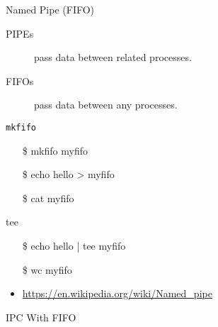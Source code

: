 \begin{frame}{Named Pipe (FIFO)}
  \begin{description}
  \item[PIPEs] pass data between related processes.
  \item[FIFOs] pass data between any processes.
  \end{description}
  \begin{block}{\texttt{mkfifo}}
    \begin{center}
      \begin{minipage}{.45\linewidth}\ttfamily
        \begin{itemize}
        \item[\$] mkfifo myfifo
        \item[\$] echo hello > myfifo
        \item[\$] cat myfifo
        \end{itemize}
      \end{minipage}\quad
      \begin{minipage}{.5\linewidth}
      \end{minipage}
    \end{center}
  \end{block}
  \ttfamily
  \begin{block}{tee}
    \begin{minipage}{.5\linewidth}
      \begin{itemize}
      \item[\$] echo hello | tee myfifo
      \item[\$] wc myfifo
      \end{itemize}
    \end{minipage}\quad
    \begin{minipage}{.45\linewidth}
    \end{minipage}
  \end{block}
\end{frame}

\begin{itemize}
\item \url{https://en.wikipedia.org/wiki/Named_pipe}
\end{itemize}

\begin{frame}{IPC With FIFO}
\end{frame}

